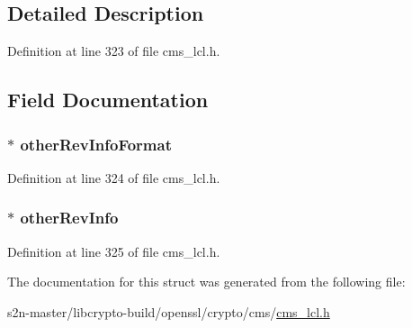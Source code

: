 \subsection{Detailed Description}


Definition at line 323 of file cms\+\_\+lcl.\+h.



\subsection{Field Documentation}
\subsubsection[{\texorpdfstring{other\+Rev\+Info\+Format}{otherRevInfoFormat}}]{$\ast$ other\+Rev\+Info\+Format}\hypertarget{struct_c_m_s___other_revocation_info_format__st_a1e031f59fb23590a5edeb07047dddfea}{}\label{struct_c_m_s___other_revocation_info_format__st_a1e031f59fb23590a5edeb07047dddfea}


Definition at line 324 of file cms\+\_\+lcl.\+h.

\subsubsection[{\texorpdfstring{other\+Rev\+Info}{otherRevInfo}}]{$\ast$ other\+Rev\+Info}\hypertarget{struct_c_m_s___other_revocation_info_format__st_a8a75f598fb65d5e349257ff20a17434c}{}\label{struct_c_m_s___other_revocation_info_format__st_a8a75f598fb65d5e349257ff20a17434c}


Definition at line 325 of file cms\+\_\+lcl.\+h.



The documentation for this struct was generated from the following file\+:\begin{DoxyCompactItemize}
\item 
s2n-\/master/libcrypto-\/build/openssl/crypto/cms/\hyperlink{cms__lcl_8h}{cms\+\_\+lcl.\+h}\end{DoxyCompactItemize}
